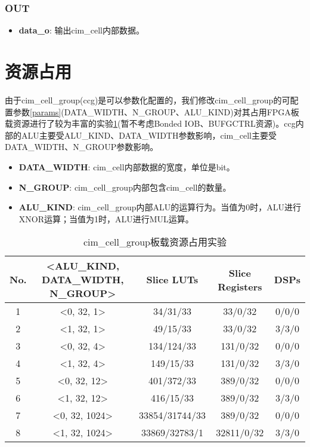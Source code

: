\documentclass[lang=cn,11pt]{elegantpaper}
\begin{document}
\subsubsection{OUT}
\begin{itemize}
	\item \textbf{data\_o}: 输出cim\_cell内部数据。
\end{itemize}

\section{资源占用}
由于cim\_cell\_group(ccg)是可以参数化配置的，我们修改cim\_cell\_group的可配置参数\ref{params}(DATA\_WIDTH、N\_GROUP、ALU\_KIND)对其占用FPGA板载资源进行了较为丰富的实验\ref{expr}(暂不考虑Bonded IOB、BUFGCTRL资源)。ccg内部的ALU主要受ALU\_KIND、DATA\_WIDTH参数影响，cim\_cell主要受DATA\_WIDTH、N\_GROUP参数影响。
\begin{itemize}
	\label{params}
	\item \textbf{DATA\_WIDTH}: cim\_cell内部数据的宽度，单位是bit。
	\item \textbf{N\_GROUP}: cim\_cell\_group内部包含cim\_cell的数量。
	\item \textbf{ALU\_KIND}: cim\_cell\_group内部ALU的运算行为。当值为0时，ALU进行XNOR运算；当值为1时，ALU进行MUL运算。
\end{itemize}
\begin{table}[!hpb]
	\center
	\caption{cim\_cell\_group板载资源占用实验}
	\label{expr}
	\begin{tabular}{|c|c|c|c|c|}
		\hline
		No. & <ALU\_KIND, DATA\_WIDTH, N\_GROUP> & Slice LUTs & Slice Registers & DSPs \\ \hline
		1 & <0, 32, 1> & 34/31/33 & 33/0/32 & 0/0/0\\ \hline
		2 & <1, 32, 1> & 49/15/33 & 33/0/32 & 3/3/0\\ \hline
		3 & <0, 32, 4> & 134/124/33 & 131/0/32 & 0/0/0\\ \hline
		4 & <1, 32, 4> & 149/15/33 & 131/0/32 & 3/3/0\\ \hline
		5 & <0, 32, 12> & 401/372/33 & 389/0/32 & 0/0/0\\ \hline
		6 & <1, 32, 12> & 416/15/33 & 389/0/32 & 3/3/0\\ \hline
		7 & <0, 32, 1024> & 33854/31744/33 & 389/0/32 & 0/0/0\\ \hline
		8 & <1, 32, 1024> & 33869/32783/1 & 32811/0/32 & 3/3/0\\ \hline
	\end{tabular}
\end{table}



\end{document}
